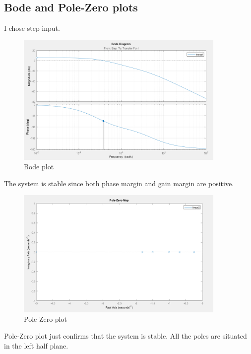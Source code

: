 \documentclass{article}
\begin{document}
\subsection{Bode and Pole-Zero plots}
I chose step input. 
\begin{figure}[H]
        \centering
        \includegraphics[width=0.9\textwidth]{sources/image2_10.png}
        \caption{Bode plot}
        \label{fig:bode1}
\end{figure}
The system is stable since both phase margin and gain margin are positive.
\begin{figure}[H]
        \centering
        \includegraphics[width=0.9\textwidth]{sources/image2_11.png}
        \caption{Pole-Zero plot}
        \label{fig:bode1}
\end{figure}
Pole-Zero plot just confirms that the system is stable. All the poles are situated in the left half plane.
\end{document}
